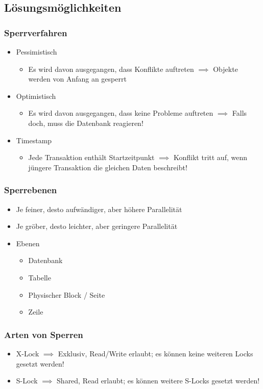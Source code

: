 \subsection{Lösungsmöglichkeiten}
\subsubsection{Sperrverfahren}
\begin{itemize}
    \item Pessimistisch
    \begin{itemize}
        \item Es wird davon ausgegangen, dass Konflikte auftreten $\implies$ Objekte werden von Anfang an gesperrt
    \end{itemize}
    \item Optimistisch
    \begin{itemize}
        \item Es wird davon ausgegangen, dass keine Probleme auftreten $\implies$ Falls doch, muss die Datenbank reagieren!
    \end{itemize}
    \item Timestamp
    \begin{itemize}
        \item Jede Transaktion enthält Startzeitpunkt $\implies$ Konflikt tritt auf, wenn jüngere Transaktion die gleichen Daten beschreibt!
    \end{itemize}
\end{itemize}
\subsubsection{Sperrebenen}
\begin{itemize}
    \item Je feiner, desto aufwändiger, aber höhere Parallelität
    \item Je gröber, desto leichter, aber geringere Parallelität
    \item Ebenen
    \begin{itemize}
        \item Datenbank
        \item Tabelle
        \item Physischer Block / Seite
        \item Zeile
    \end{itemize}
\end{itemize}
\subsubsection{Arten von Sperren}
\begin{itemize}
    \item X-Lock $\implies$ Exklusiv, Read/Write erlaubt; es können keine weiteren Locks gesetzt werden!
    \item S-Lock $\implies$ Shared, Read erlaubt; es können weitere S-Locks gesetzt werden!
\end{itemize}
